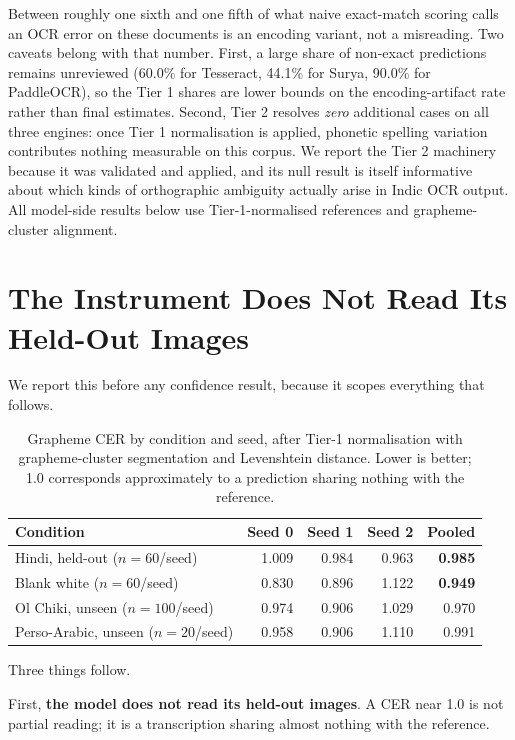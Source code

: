 \documentclass{article}
\begin{document}
Between roughly one sixth and one fifth of what naive exact-match scoring calls an OCR error
on these documents is an encoding variant, not a misreading. Two caveats belong with that
number. First, a large share of non-exact predictions remains unreviewed (60.0\% for
Tesseract, 44.1\% for Surya, 90.0\% for PaddleOCR), so the Tier 1 shares are lower bounds on
the encoding-artifact rate rather than final estimates. Second, Tier 2 resolves \emph{zero}
additional cases on all three engines: once Tier 1 normalisation is applied, phonetic
spelling variation contributes nothing measurable on this corpus. We report the Tier 2
machinery because it was validated and applied, and its null result is itself informative
about which kinds of orthographic ambiguity actually arise in Indic OCR output. All
model-side results below use Tier-1-normalised references and grapheme-cluster alignment.

\section{The Instrument Does Not Read Its Held-Out Images}
\label{sec:cer}

We report this before any confidence result, because it scopes everything that follows.

\begin{table}[h]
\small
\centering
\caption{Grapheme CER by condition and seed, after Tier-1 normalisation with grapheme-cluster
segmentation and Levenshtein distance. Lower is better; 1.0 corresponds approximately to a
prediction sharing nothing with the reference.}
\label{tab:cer}
\begin{tabular}{lrrrr}
\toprule
Condition & Seed 0 & Seed 1 & Seed 2 & Pooled \\
\midrule
Hindi, held-out ($n=60$/seed)    & 1.009 & 0.984 & 0.963 & \textbf{0.985} \\
Blank white ($n=60$/seed)          & 0.830 & 0.896 & 1.122 & \textbf{0.949} \\
Ol Chiki, unseen ($n=100$/seed)    & 0.974 & 0.906 & 1.029 & 0.970 \\
Perso-Arabic, unseen ($n=20$/seed) & 0.958 & 0.906 & 1.110 & 0.991 \\
\bottomrule
\end{tabular}
\end{table}

Three things follow.

First, \textbf{the model does not read its held-out images}. A CER near 1.0 is not partial
reading; it is a transcription sharing almost nothing with the reference.
\end{document}
